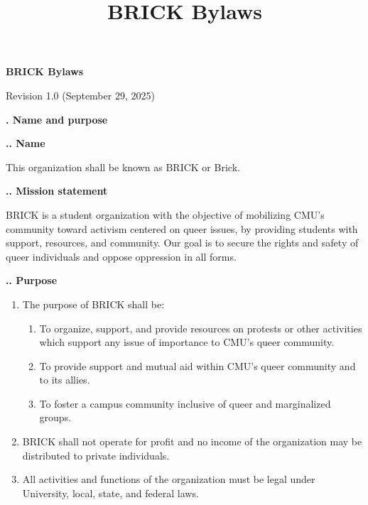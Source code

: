 \documentclass[11pt]{article}
\title{BRICK Bylaws}
\newcounter{h1}
\newcounter{h2}[h1]
\newcounter{h3}[h2]
\begin{document}
\newcommand{\tab}[1]{\stepcounter{h1}\par\large\textbf{\arabic{h1}. #1}\normalsize\par}
\newcommand{\subtab}[1]{\stepcounter{h2}\par\textbf{\arabic{h1}.\arabic{h2}. #1}\par}
\newcommand{\subsubtab}[1]{\stepcounter{h3}\par\small\textbf{\arabic{h1}.\arabic{h2}.\arabic{h3}. #1}\normalsize\par}
\renewcommand{\labelenumi}{\arabic{enumi}.} 
\renewcommand{\labelenumii}{\arabic{enumi}.\arabic{enumii}.}
\renewcommand{\labelenumiii}{\arabic{enumi}.\arabic{enumii}.\arabic{enumiii}.}
\renewcommand{\labelenumiv}{\arabic{enumi}.\arabic{enumii}.\arabic{enumiii}.\arabic{enumiv}.}

\raggedright


\begin{center}
\Large
\textbf{BRICK Bylaws}

\normalsize
Revision 1.0 (September 29, 2025)
\end{center}


\tab{Name and purpose}

\subtab{Name}

This organization shall be known as BRICK or Brick.

\subtab{Mission statement}

BRICK is a student organization with the objective of mobilizing CMU's community toward activism centered on queer issues, by providing students with support, resources, and community. Our goal is to secure the rights and safety of queer individuals and oppose oppression in all forms.

\subtab{Purpose}

\begin{enumerate}
    \item The purpose of BRICK shall be:
          \begin{enumerate}
            \item To organize, support, and provide resources on protests or other activities which support any issue of importance to CMU's queer community.
            \item To provide support and mutual aid within CMU's queer community and to its allies.
            \item To foster a campus community inclusive of queer and marginalized groups.
          \end{enumerate}
    \item BRICK shall not operate for profit and no income of the organization may be distributed to private individuals.
    \item All activities and functions of the organization must be legal under University, local, state, and federal laws.
\end{enumerate}
\end{document}
